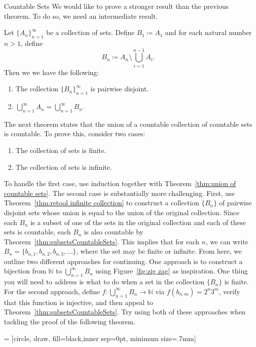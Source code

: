 \begin{section}{Countable Sets}
We would like to prove a stronger result than the previous theorem. To do so, we need an intermediate result. 

\begin{theorem}\label{thm:retool infinite collection}
Let $\{A_n\}_{n=1}^{\infty}$ be a collection of sets. Define $B_1\coloneqq A_1$ and for each natural number $n>1$, define
\[
B_n\coloneqq A_n\setminus \bigcup_{i=1}^{n-1}A_i.
\]
Then we we have the following:
\begin{enumerate}[label=\textrm{(\alph*)}]
\item The collection $\{B_n\}_{n=1}^{\infty}$ is pairwise disjoint.
\item $\displaystyle \bigcup_{n=1}^{\infty}A_n =\bigcup_{n=1}^{\infty}B_n$.
\end{enumerate}
\end{theorem}

The next theorem states that the union of a countable collection of countable sets is countable. To prove this, consider two cases:
\begin{enumerate}
\item The collection of sets is finite.  
\item The collection of sets is infinite.
\end{enumerate}
To handle the first case, use induction together with Theorem~\ref{thm:union of countable sets}. The second case is substantially more challenging.  First, use Theorem~\ref{thm:retool infinite collection} to construct a collection $\{B_n\}$ of pairwise disjoint sets whose union is equal to the union of the original collection. Since each $B_n$ is a subset of one of the sets in the original collection and each of these sets is countable, each $B_n$ is also countable by Theorem~\ref{thm:subsetsCountableSets}. This implies that for each $n$, we can write $B_n=\{b_{n,1}, b_{n,2},b_{n,3},\ldots\}$, where the set may be finite or infinite. From here, we outline two different approaches for continuing.  One approach is to construct a bijection from $\mathbb{N}$ to $\bigcup_{n=1}^{\infty}B_n$ using Figure~\ref{fig:zig zag} as inspiration.  One thing you will need to address is what to do when a set in the collection $\{B_n\}$ is finite. For the second approach, define $f:\bigcup_{n=1}^{\infty}B_n\to \mathbb{N}$ via $f(b_{n,m})=2^n3^m$, verify that this function is injective, and then appeal to Theorem~\ref{thm:subsetsCountableSets}.  Try using both of these approaches when tackling the proof of the following theorem.

 = [circle, draw, fill=black,inner sep=0pt, minimum size=.7mm]


\end{section}
